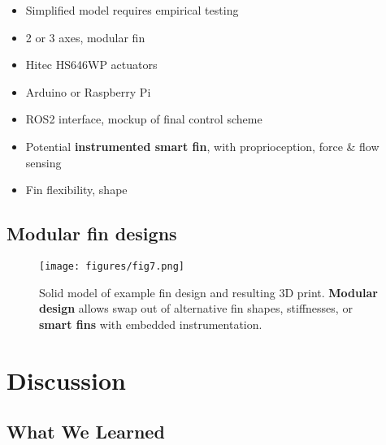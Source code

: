 \documentclass[twocolumn,10pt]{IEEEtran}
\begin{document}
\begin{itemize}
\item Simplified model requires empirical testing
\item 2 or 3 axes, modular fin
\item Hitec HS646WP actuators
\item Arduino or Raspberry Pi
\item ROS2 interface, mockup of final control scheme
\item Potential \textbf{instrumented smart fin}, with proprioception, force \& flow sensing
\item Fin flexibility, shape
\end{itemize}

\subsection{Modular fin designs}
\begin{figure}
\begin{center}
\texttt{[image: figures/fig7.png]}
\end{center}
\caption{Solid model of example fin design and resulting 3D print. \textbf{Modular design} allows swap out of alternative fin shapes, stiffnesses, or \textbf{smart fins} with embedded instrumentation.}
\end{figure}

\section{Discussion}
\subsection{What We Learned}
\end{document}

